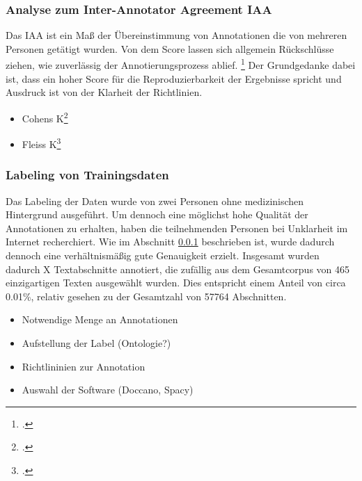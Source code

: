\subsubsection{Analyse zum Inter-Annotator Agreement \ac{IAA}}\label{sec:IAA}
Das \acf*{IAA} ist ein Maß der Übereinstimmung von Annotationen die von mehreren Personen getätigt wurden. Von dem Score lassen sich allgemein Rückschlüsse ziehen, wie zuverlässig der Annotierungsprozess ablief. \footcite[vgl.][S.298]{ide2017} Der Grundgedanke dabei ist, dass ein hoher Score für die Reproduzierbarkeit der Ergebnisse spricht und Ausdruck ist von der Klarheit der Richtlinien.

\begin{itemize}
    \item Cohens K\footcite[vgl.][S.]{cohen1960}
    \item Fleiss K\footcite[vgl.][S.]{fleiss1971}
\end{itemize}

\subsubsection{Labeling von Trainingsdaten}
Das Labeling der Daten wurde von zwei Personen ohne medizinischen Hintergrund ausgeführt. Um dennoch eine möglichst hohe Qualität der Annotationen zu erhalten, haben die teilnehmenden Personen bei Unklarheit im Internet recherchiert. Wie im Abschnitt \ref{sec:IAA} beschrieben ist, wurde dadurch dennoch eine verhältnismäßig gute Genauigkeit erzielt.
Insgesamt wurden dadurch X Textabschnitte annotiert, die zufällig aus dem Gesamtcorpus von 465 einzigartigen Texten ausgewählt wurden. Dies entspricht einem Anteil von circa 0.01\%, relativ gesehen zu der Gesamtzahl von 57764 Abschnitten.


\begin{itemize}
    \item Notwendige Menge an Annotationen
    \item Aufstellung der Label (Ontologie?)
    \item Richtlininien zur Annotation
    \item Auswahl der Software (Doccano, Spacy)
\end{itemize}
